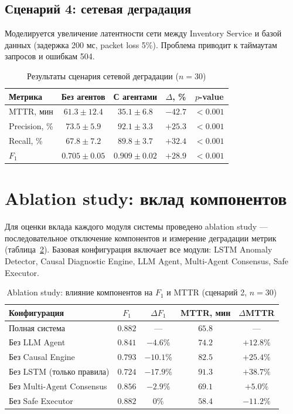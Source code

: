 \subsection{Сценарий 4: сетевая деградация}

Моделируется увеличение латентности сети между Inventory Service и базой данных (задержка 200 мс, packet loss 5\%). Проблема приводит к таймаутам запросов и ошибкам 504.

\begin{table}[H]
\centering
\small
\caption{Результаты сценария сетевой деградации ($n = 30$)}
\label{tab:scenario4_results}
\begin{tabular}{|l|c|c|c|c|}
\hline
\textbf{Метрика} & \textbf{Без агентов} & \textbf{С агентами} & \textbf{$\Delta$, \%} & \textbf{$p$-value} \\
\hline
MTTR, мин & $61.3 \pm 12.4$ & $35.1 \pm 6.8$ & $-42.7$ & $< 0.001$ \\
\hline
Precision, \% & $73.5 \pm 5.9$ & $92.1 \pm 3.3$ & $+25.3$ & $< 0.001$ \\
\hline
Recall, \% & $67.8 \pm 7.2$ & $89.8 \pm 3.7$ & $+32.4$ & $< 0.001$ \\
\hline
$F_1$ & $0.705 \pm 0.05$ & $0.909 \pm 0.02$ & $+28.9$ & $< 0.001$ \\
\hline
\end{tabular}
\end{table}

\section{Ablation study: вклад компонентов}

Для оценки вклада каждого модуля системы проведено ablation study --- последовательное отключение компонентов и измерение деградации метрик (таблица~\ref{tab:ablation_study}). Базовая конфигурация включает все модули: LSTM Anomaly Detector, Causal Diagnostic Engine, LLM Agent, Multi-Agent Consensus, Safe Executor.

\begin{table}[H]
\centering
\small
\caption{Ablation study: влияние компонентов на $F_1$ и MTTR (сценарий 2, $n = 30$)}
\label{tab:ablation_study}
\begin{tabular}{|p{5cm}|c|c|c|c|}
\hline
\textbf{Конфигурация} & \textbf{$F_1$} & \textbf{$\Delta F_1$} & \textbf{MTTR, мин} & \textbf{$\Delta$MTTR} \\
\hline
Полная система & $0.882$ & --- & $65.8$ & --- \\
\hline
Без LLM Agent & $0.841$ & $-4.6\%$ & $74.2$ & $+12.8\%$ \\
\hline
Без Causal Engine & $0.793$ & $-10.1\%$ & $82.5$ & $+25.4\%$ \\
\hline
Без LSTM (только правила) & $0.724$ & $-17.9\%$ & $91.3$ & $+38.7\%$ \\
\hline
Без Multi-Agent Consensus & $0.856$ & $-2.9\%$ & $69.1$ & $+5.0\%$ \\
\hline
Без Safe Executor & $0.882$ & $0\%$ & $58.4$ & $-11.2\%$ \\
\hline
\end{tabular}
\end{table}


